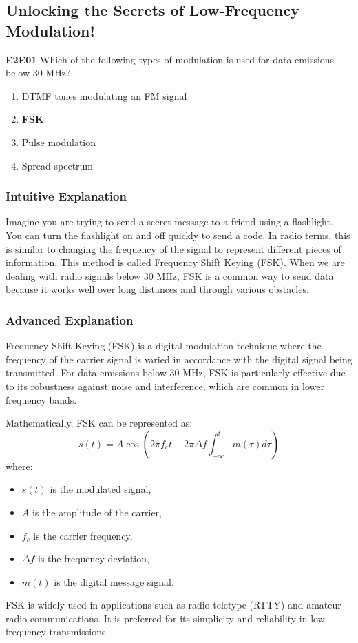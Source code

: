 \subsection{Unlocking the Secrets of Low-Frequency Modulation!}

\begin{tcolorbox}[colback=gray!10!white,colframe=black!75!black,title=Multiple Choice Question]
    \textbf{E2E01} Which of the following types of modulation is used for data emissions below 30 MHz?
    \begin{enumerate}[label=\Alph*.]
        \item DTMF tones modulating an FM signal
        \item \textbf{FSK}
        \item Pulse modulation
        \item Spread spectrum
    \end{enumerate}
\end{tcolorbox}

\subsubsection{Intuitive Explanation}
Imagine you are trying to send a secret message to a friend using a flashlight. You can turn the flashlight on and off quickly to send a code. In radio terms, this is similar to changing the frequency of the signal to represent different pieces of information. This method is called Frequency Shift Keying (FSK). When we are dealing with radio signals below 30 MHz, FSK is a common way to send data because it works well over long distances and through various obstacles.

\subsubsection{Advanced Explanation}
Frequency Shift Keying (FSK) is a digital modulation technique where the frequency of the carrier signal is varied in accordance with the digital signal being transmitted. For data emissions below 30 MHz, FSK is particularly effective due to its robustness against noise and interference, which are common in lower frequency bands.

Mathematically, FSK can be represented as:
\[ s(t) = A \cos(2\pi f_c t + 2\pi \Delta f \int_{-\infty}^{t} m(\tau) d\tau) \]
where:
\begin{itemize}
    \item \( s(t) \) is the modulated signal,
    \item \( A \) is the amplitude of the carrier,
    \item \( f_c \) is the carrier frequency,
    \item \( \Delta f \) is the frequency deviation,
    \item \( m(t) \) is the digital message signal.
\end{itemize}

FSK is widely used in applications such as radio teletype (RTTY) and amateur radio communications. It is preferred for its simplicity and reliability in low-frequency transmissions.

